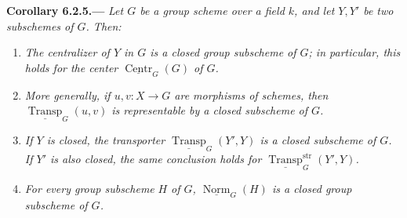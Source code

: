 \medskip
{}\label{cor:sga3-VIB-6.2.5}%
\noindent\textbf{Corollary 6.2.5.---}
\emph{Let \(G\) be a group scheme over a field \(k\), and let
\(Y,Y'\) be two subschemes of \(G\). Then:}
\begin{enumerate}
\item[\textup{(i)}]\label{concl:sga3-VIB-6.2.5-i}
  \emph{The centralizer of \(Y\) in \(G\) is a closed group
  subscheme of \(G\); in particular, this holds for the center
  \(\underline{\operatorname{Centr}}_G(G)\) of \(G\).}
\item[\textup{(i\(^{\prime}\))}]
  \label{concl:sga3-VIB-6.2.5-iprime}
  \emph{More generally, if \(u,v:X\to G\) are morphisms of
  schemes, then \(\underline{\operatorname{Transp}}_G(u,v)\) is
  representable by a closed subscheme of \(G\).}
\item[\textup{(ii)}]\label{concl:sga3-VIB-6.2.5-ii}
  \emph{If \(Y\) is closed, the transporter
  \(\underline{\operatorname{Transp}}_G(Y',Y)\) is a closed
  subscheme of \(G\). If \(Y'\) is also closed, the same
  conclusion holds for
  \(\underline{\operatorname{Transp}}^{\mathrm{str}}_G(Y',Y)\).}
\item[\textup{(iii)}]\label{concl:sga3-VIB-6.2.5-iii}
  \emph{For every group subscheme}%
  \emph{\(H\) of \(G\),
  \(\underline{\operatorname{Norm}}_G(H)\) is a closed group
  subscheme of \(G\).}
\end{enumerate}

